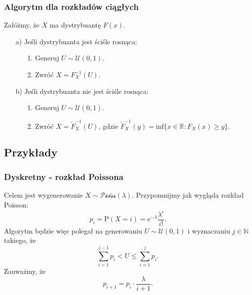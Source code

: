 \documentclass[12pt]{mwrep}
\begin{document}
	\subsubsection{Algorytm dla rozkładów ciągłych}
	\noindent Załóżmy, że $X$ ma dystrybuantę $F(x)$.
	\begin{enumerate}[leftmargin=10mm]
		\item[a)] Jeśli dystrybuanta jest ściśle rosnąca:
		\begin{enumerate}
			\item[1.] Generuj $U \sim \mathcal{U}(0, 1)$.
			\item[2.] Zwróć $ X = F_X^{-1}(U) $.
		\end{enumerate}
		\item[b)] Jeśli dystrybuanta nie jest ściśle rosnąca:
		\begin{enumerate}
			\item[1.] Generuj $U \sim \mathcal{U}(0, 1)$.
			\item[2.] Zwróć $ X = \widetilde{F}_X^{-1}(U) $, gdzie $ \widetilde{F}_X^{-1}(y) = \mathrm{inf}\{x \in \mathbb{R}: F_X(x) \geqslant y\} $.
		\end{enumerate}
	\end{enumerate}

	\subsection{Przykłady}
	
	\subsubsection{Dyskretny - rozkład Poissona}
	\noindent Celem jest wygenerowanie $X \sim \mathcal{Poiss}(\lambda)$. Przypomnijmy jak wygląda rozkład Poisson:
	$$ p_i = \mathrm{P}(X = i) = \mathrm{e}^{-\lambda} \frac{\lambda^i}{i!}. $$
	Algorytm będzie więc polegał na generowaniu $U \sim \mathcal{U}(0, 1)$ i wyznaczaniu $j \in \mathbb{N} $ takiego, że 
	$$ \sum\limits_{i=1}^{j-1} p_i < U \leqslant \sum\limits_{i=1}^{j} p_i. $$
	Zauważmy, że
	$$ p_{i + 1} = p_i \cdot \frac{\lambda}{i + 1}. $$
	
\end{document}
